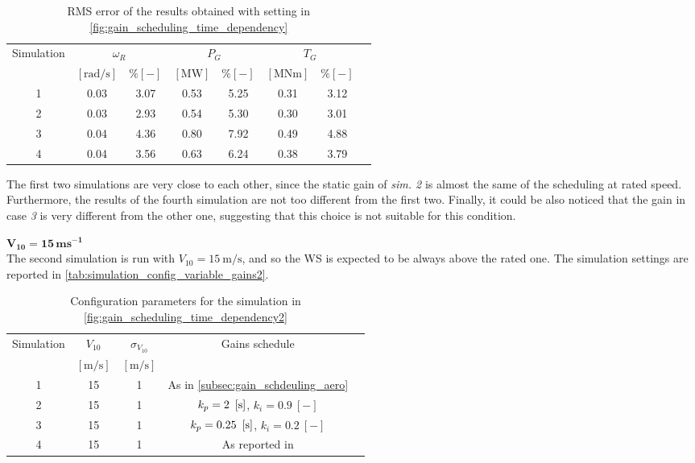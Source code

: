 \begin{table}[!htbp]
  \caption{RMS error of the results obtained with setting in \autoref{fig:gain_scheduling_time_dependency}}
  \centering
  \begin{tabular}{cccccccc}
    \toprule
      Simulation & \multicolumn{2}{c}{$\omega_R$} & \multicolumn{2}{c}{$P_G$} & \multicolumn{2}{c}{$T_G$} \\ 
       & $\left[\si{\radian\per\second}\right]$ & $ \% \left[-\right]$ & $\left[\si{\mega\watt}\right]$ & $ \% \left[-\right]$ & $\left[\si{\mega\newton\meter} \right]$ & $ \% \left[-\right]$ \\ \midrule       
       1 &  0.03 &  3.07 &  0.53  &  5.25  &  0.31  &  3.12 \\
       2 &  0.03 &  2.93 &  0.54  &  5.30  &  0.30  &  3.01 \\
       3 &  0.04 &  4.36 &  0.80  &  7.92  &  0.49  &  4.88 \\
       4 &  0.04 &  3.56 &  0.63  &  6.24  &  0.38  &  3.79 \\
     \bottomrule
  \end{tabular}
  \label{tab:res_variable_gains}
\end{table}

The first two simulations are very close to each other, since the static gain of \textit{sim. 2} is almost the same of the scheduling at rated speed. Furthermore, the results of the fourth simulation are not too different from the first two. Finally, it could be also noticed that the gain in case \textit{3} is very different from the other one, suggesting that this choice is not suitable for this condition. 

$\mathbf{V_{10}=15 \, ms^{-1}}$\\
The second simulation is run with $V_{10}=15 \ \si{\meter\per\second}$, and so the WS is expected to be always above the rated one. The simulation settings are reported in \autoref{tab:simulation_config_variable_gains2}.
\begin{table}[!htbp]
  \caption{Configuration parameters for the simulation in \autoref{fig:gain_scheduling_time_dependency2}}
  \centering
  \begin{tabular}{ccccc}
  \toprule
    Simulation & $V_{10}$  & $\sigma_{V_{10}}$ & Gains schedule \\ 
     & $\left[\si{\meter\per\second}\right]$ & $\left[\si{\meter\per\second}\right]$ & \\ \midrule       
     1 & 15 & 1 & As in \autoref{subsec:gain_schdeuling_aero}  \\
     2 & 15 & 1 & $k_p = 2 \ \mesunt{\second}$, $k_i=0.9 \ [-]$ \\
     3 & 15 & 1 & $k_p = 0.25 \ \mesunt{\second}$, $k_i=0.2 \ [-]$  \\
     4 & 15 & 1 & As reported in \cite{Olimpo_Anaya‐Lara}  \\
     \bottomrule
  \end{tabular}
  \label{tab:simulation_config_variable_gains2}
\end{table}

